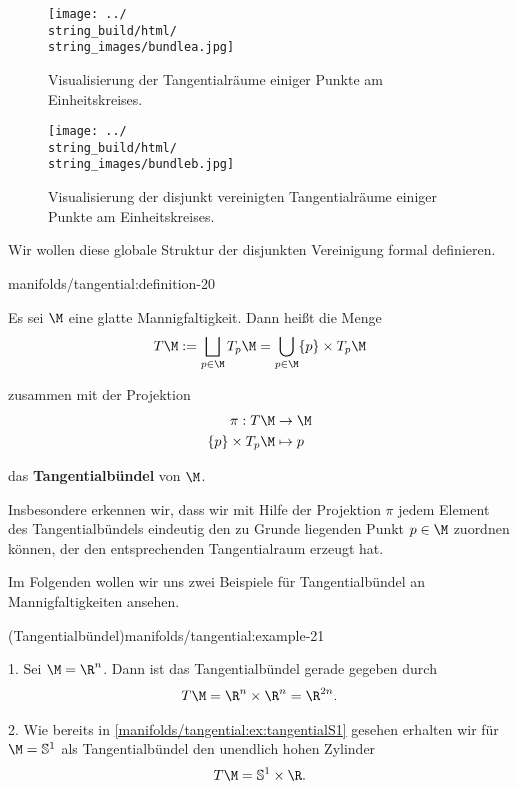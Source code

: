 \documentclass[letterpaper,10pt,german]{jupyterBook}
\begin{document}
\begin{figure}[htbp]
\centering


\noindent\texttt{[image: ../\\string\_build/html/\\string\_images/bundlea.jpg]}
\caption{Visualisierung der Tangentialräume einiger Punkte am Einheitskreises.}\label{\detokenize{manifolds/tangential:fig-bundlea}}\end{figure}

\begin{figure}[htbp]
\centering


\noindent\texttt{[image: ../\\string\_build/html/\\string\_images/bundleb.jpg]}
\caption{Visualisierung der disjunkt vereinigten Tangentialräume einiger Punkte am Einheitskreises.}\label{\detokenize{manifolds/tangential:fig-bundleb}}\end{figure}

\par
Wir wollen diese globale Struktur der disjunkten Vereinigung formal definieren.
\begin{definition}{}{manifolds/tangential:definition-20}



\par
Es sei \(\M\) eine glatte Mannigfaltigkeit.
Dann heißt die Menge
\begin{align*}
T\M := \bigsqcup_{p\in\M}  T_p\M = \bigcup_{p\in\M} \{p\} \times T_p\M
\end{align*}
\par
zusammen mit der Projektion
\begin{align*}
\pi:T\M &\to \M\\
\{p\}\times T_p\M &\mapsto p
\end{align*}
\par
das \textbf{Tangentialbündel} von \(\M\).
\end{definition}

\par
Insbesondere erkennen wir, dass wir mit Hilfe der Projektion \(\pi\) jedem Element des Tangentialbündels eindeutig den zu Grunde liegenden Punkt \(p\in\M\) zuordnen können, der den entsprechenden Tangentialraum erzeugt hat.

\par
Im Folgenden wollen wir uns zwei Beispiele für Tangentialbündel an Mannigfaltigkeiten ansehen.
\begin{example}{(Tangentialbündel)}{manifolds/tangential:example-21}





\par
1. Sei \(\M=\R^n\).
Dann ist das Tangentialbündel gerade gegeben durch
\begin{align*}
T\M = \R^n\times\R^n = \R^{2n}.
\end{align*}


\par
2. Wie bereits in \cref{manifolds/tangential:ex:tangentialS1} gesehen erhalten wir für \(\M=\mathbb{S}^1\) als Tangentialbündel den unendlich hohen Zylinder
\begin{align*}
T\M = \mathbb{S}^1\times \R.
\end{align*}\end{example}
\end{document}
